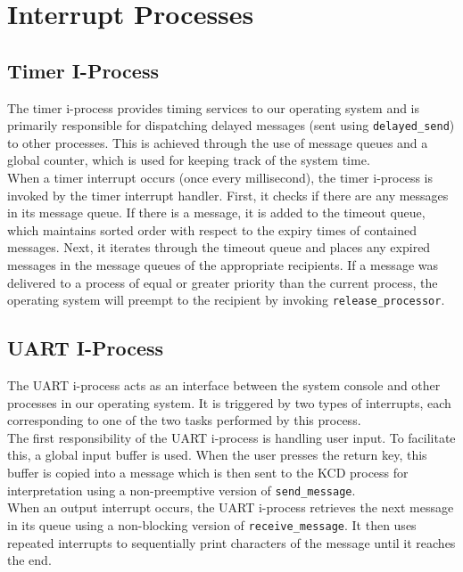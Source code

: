 \documentclass[12pt]{report}
\begin{document}
\section{Interrupt Processes}

\subsection{Timer I-Process}
\label{subsec:Timer I-Process}

The timer i-process provides timing services to our operating system and is primarily responsible for dispatching delayed messages (sent using \texttt{delayed_send}) to other processes. This is achieved through the use of message queues and a global counter, which is used for keeping track of the system time.\\

When a timer interrupt occurs (once every millisecond), the timer i-process is invoked by the timer interrupt handler. First, it checks if there are any messages in its message queue. If there is a message, it is added to the timeout queue, which maintains sorted order with respect to the expiry times of contained messages. Next, it iterates through the timeout queue and places any expired messages in the message queues of the appropriate recipients. If a message was delivered to a process of equal or greater priority than the current process, the operating system will preempt to the recipient by invoking \texttt{release_processor}.

\subsection{UART I-Process}
\label{subsec:UART I-Process}

The UART i-process acts as an interface between the system console and other processes in our operating system. It is triggered by two types of interrupts, each corresponding to one of the two tasks performed by this process.\\

The first responsibility of the UART i-process is handling user input. To facilitate this, a global input buffer is used. When the user presses the return key, this buffer is copied into a message which is then sent to the KCD process for interpretation using a non-preemptive version of \texttt{send_message}.\\

When an output interrupt occurs, the UART i-process retrieves the next message in its queue using a non-blocking version of \texttt{receive_message}. It then uses repeated interrupts to sequentially print characters of the message until it reaches the end.
\end{document}
